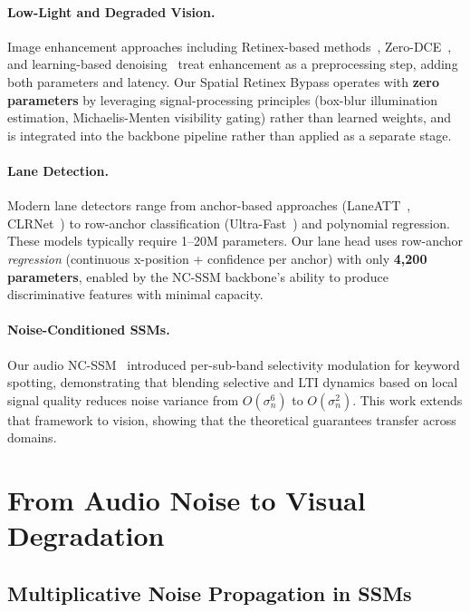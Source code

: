 \documentclass[10pt,twocolumn,letterpaper]{article}
\begin{document}
\paragraph{Low-Light and Degraded Vision.}
Image enhancement approaches including Retinex-based methods~\cite{land1977retinex,wei2018deepretinex}, Zero-DCE~\cite{guo2020zerodce}, and learning-based denoising~\cite{zamir2022restormer} treat enhancement as a preprocessing step, adding both parameters and latency.
Our Spatial Retinex Bypass operates with \textbf{zero parameters} by leveraging signal-processing principles (box-blur illumination estimation, Michaelis-Menten visibility gating) rather than learned weights, and is integrated into the backbone pipeline rather than applied as a separate stage.

\paragraph{Lane Detection.}
Modern lane detectors range from anchor-based approaches (LaneATT~\cite{tabelini2021laneatt}, CLRNet~\cite{zheng2022clrnet}) to row-anchor classification (Ultra-Fast~\cite{qin2020ultrafast}) and polynomial regression.
These models typically require 1--20M parameters.
Our lane head uses row-anchor \emph{regression} (continuous x-position + confidence per anchor) with only \textbf{4,200 parameters}, enabled by the NC-SSM backbone's ability to produce discriminative features with minimal capacity.

\paragraph{Noise-Conditioned SSMs.}
Our audio NC-SSM~\cite{choi2026ncssm} introduced per-sub-band selectivity modulation for keyword spotting, demonstrating that blending selective and LTI dynamics based on local signal quality reduces noise variance from $O(\sigma_n^6)$ to $O(\sigma_n^2)$.
This work extends that framework to vision, showing that the theoretical guarantees transfer across domains.


\section{From Audio Noise to Visual Degradation}
\label{sec:theory}

\subsection{Multiplicative Noise Propagation in SSMs}
\end{document}
